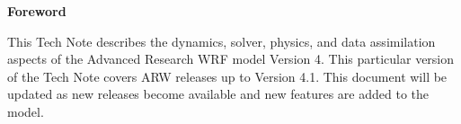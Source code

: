 \begin{titlepage}
\newpage
\vspace*{2cm}
\vskip 24pt
\begin{center}
\textbf{Foreword}
\end{center}
\vspace{1cm}
This Tech Note describes the dynamics, solver, physics, and data assimilation aspects of the Advanced
Research WRF model Version 4. This particular version of the Tech Note covers ARW releases up to Version 4.1.
This document will be updated as new releases become available and new features are added to the model.

\vfill
\pagebreak
\hphantom{This page is left blank}

\rmfamily
\end{titlepage}
\setcounter{page}{1}
